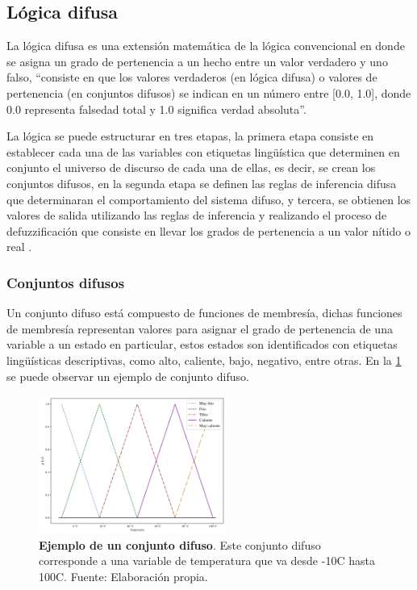 	\subsection{Lógica difusa}
		
		La lógica difusa es una extensión matemática de la lógica convencional en donde se asigna un grado de pertenencia a un hecho entre un valor verdadero y uno falso, \enquote{consiste en que los valores verdaderos (en lógica difusa) o valores de pertenencia (en conjuntos difusos) se indican en un número entre [0.0, 1.0], donde 0.0 representa falsedad total y 1.0 significa verdad absoluta}\Parencite[p.$\,$4]{cruz2010inteligencia}.
		
		La lógica se puede estructurar en tres etapas, la primera etapa consiste en establecer cada una de las variables con etiquetas lingüística que determinen en conjunto el universo de discurso de cada una de ellas, es decir, se crean los conjuntos difusos, en la segunda etapa se definen las reglas de inferencia difusa que determinaran el comportamiento del sistema difuso, y tercera, se obtienen los valores de salida utilizando las reglas de inferencia y realizando el proceso de defuzzificación que consiste en llevar los grados de pertenencia a un valor nítido o real \Parencite{cruz2010inteligencia}.
		
		\subsubsection{Conjuntos difusos}
			
			Un conjunto difuso está compuesto de funciones de membresía, dichas funciones de membresía representan valores para asignar el grado de pertenencia de una variable a un estado en particular, estos estados son identificados con etiquetas lingüísticas descriptivas, como alto, caliente, bajo, negativo, entre otras. En la \cref{fig:FuzzySet} se puede observar un ejemplo de conjunto difuso.
			
			\begin{figure}[htb]
				\centering
				\includegraphics[width=0.55\textwidth]{FuzzySet.pdf}
				\caption[Ejemplo de un conjunto difuso]{\textbf{Ejemplo de un conjunto difuso}. Este conjunto difuso corresponde a una variable de temperatura que va desde -10\textdegree C hasta 100\textdegree C. Fuente: Elaboración propia.} 
				\label{fig:FuzzySet}
			\end{figure}
			
